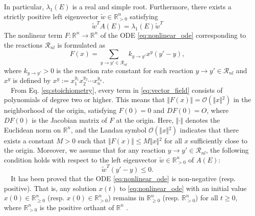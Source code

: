 \documentclass[11pt,a4paper]{article}
\begin{document}
In particular, $\lambda_1(E)$ is a real and simple root. Furthermore, there exists a strictly positive left eigenvector $\tilde{w} \in \mathbb{R}^n_{> 0}$ satisfying
\begin{equation}
\tilde{w}^T A(E) = \lambda_1(E) \tilde{w}^T \label{eq:left_eigenvector}
\end{equation}
The nonlinear term $F: \mathbb{R}^n \to \mathbb{R}^n$ of the ODE \eqref{eq:nonlinear_ode} corresponding to the reactions $\mathcal{R}_{nl}$ is formulated as
\begin{equation}
F(x) = \sum_{y \to y' \in \mathcal{R}_{nl}} k_{y \to y'} x^y (y' - y), \label{eq:vector_field}
\end{equation}
where $k_{y \to y'} > 0$ is the reaction rate constant for each reaction $y \to y' \in \mathcal{R}_{nl}$ and $x^y$ is defined by $x^y :=  x_1^{y_1}x_2^{y_2}\cdots x_n^{y_n}$. \\
~~From Eq. \eqref{eq:stoichiometry}, every term in \eqref{eq:vector_field} consists of polynomials of degree two or higher. This means that $\Vert{}F(x)\Vert{} = \mathcal{O}(\Vert{}x\Vert{}^2)$ in the neighborhood of the origin, satisfying $F(0) = 0$ and $DF(0) = O$, where $DF(0)$ is the Jacobian matrix of $F$ at the origin. Here, $\Vert{} \cdot \Vert{}$ denotes the Euclidean norm on $\mathbb{R}^n$, and the Landau symbol $\mathcal{O}(\Vert{}x\Vert{}^2)$ indicates that there exists a constant $M>0$ such that $\Vert{}F(x)\Vert{} \le M \Vert{}x\Vert{}^2$ for all $x$ sufficiently close to the origin. Moreover, we assume that for any reaction $y \to y' \in \mathcal{R}_{nl}$, the following condition holds with respect to the left eigenvector $\tilde{w} \in \mathbb{R}^n_{> 0}$ of $A(E)$:
\begin{equation}
\tilde{w}^T (y' - y) \le 0. \label{eq:dissipativity}
\end{equation}
~~It has been proved that the ODE \eqref{eq:nonlinear_ode} is non-negative (resp. positive). That is, any solution $x(t)$ to \eqref{eq:nonlinear_ode} with an initial value $x(0) \in \mathbb{R}^n_{\geq 0}$ (resp. $x(0) \in \mathbb{R}^n_{> 0}$) remains in $\mathbb{R}^n_{\geq 0}$ (resp. $\mathbb{R}^n_{> 0}$) for all $t \geq 0$, where ${\mathbb R}_{>0}^n$ is the positive orthant of ${\mathbb R}^n$ \cite{chella}. 
\end{document}
